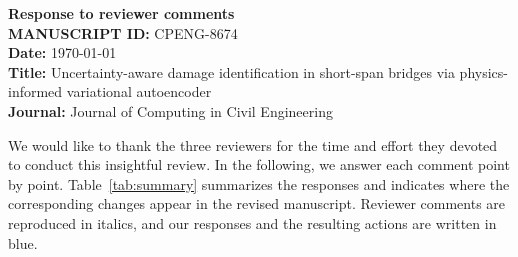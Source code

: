 \documentclass[11pt]{article}
\begin{document}
\begin{center}
{\Large\bfseries Response to reviewer comments}\\[8pt]
\textbf{MANUSCRIPT ID:} CPENG-8674\\
\textbf{Date:} \today\\
\textbf{Title:} Uncertainty-aware damage identification in short-span bridges via physics-informed variational
autoencoder\\
\textbf{Journal:} Journal of Computing in Civil Engineering
\end{center}

\noindent{}

\bigskip
We would like to thank the three reviewers for the time and effort they devoted to conduct this insightful review.
In the following, we answer each comment point by point. Table~\ref{tab:summary} summarizes the responses and indicates where
the corresponding changes appear in the revised manuscript. Reviewer comments are reproduced in italics, and our responses and the resulting actions are written in blue.

\end{document}
